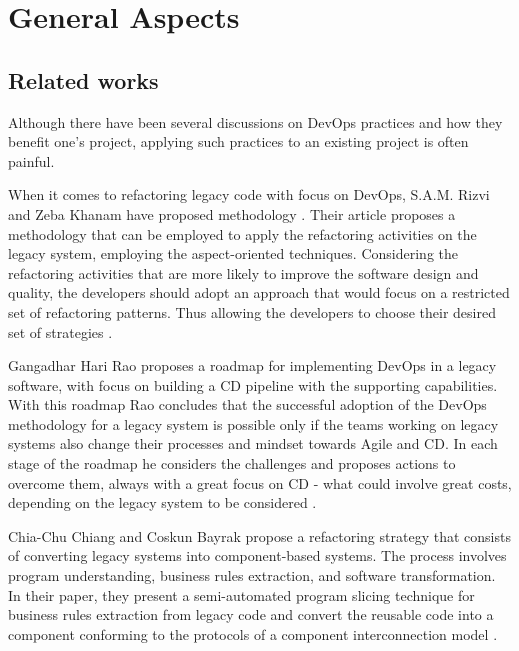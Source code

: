 
\chapter[General Aspects]{General Aspects}

\section{Related works}

Although there have been several discussions on DevOps practices and how they
benefit one's project, applying such practices to an existing project is often
painful. 

When it comes to refactoring legacy code with focus on DevOps, S.A.M. Rizvi and
Zeba Khanam have proposed methodology \cite{zeba2011}. Their article proposes a
methodology that can be employed to apply the refactoring activities on the
legacy system, employing the aspect-oriented techniques. Considering the
refactoring activities that are more likely to improve the software design and
quality, the developers should adopt an approach that would focus on a
restricted set of refactoring patterns. Thus allowing the developers to choose
their desired set of strategies \cite{zeba2011}.

Gangadhar Hari Rao proposes a roadmap for implementing DevOps in a legacy
software, with focus on building a CD pipeline with the supporting capabilities.
With this roadmap Rao concludes that  the successful adoption of the DevOps
methodology for a legacy system is possible only if the teams working on legacy
systems also change their processes and mindset towards Agile and CD. In each
stage of the roadmap he considers the challenges and proposes actions to
overcome them, always with a great focus on CD - what could involve great costs,
depending on the legacy system to be considered \cite{infosys2018}.

Chia-Chu Chiang and Coskun Bayrak propose a refactoring strategy that consists
of converting legacy systems into component-based systems. The process involves
program understanding, business rules extraction, and software transformation.
In their paper, they present a semi-automated program slicing technique for
business rules extraction from legacy code and convert the reusable code into a
component conforming to the protocols of a component interconnection model
\cite{bayrak2006}.


